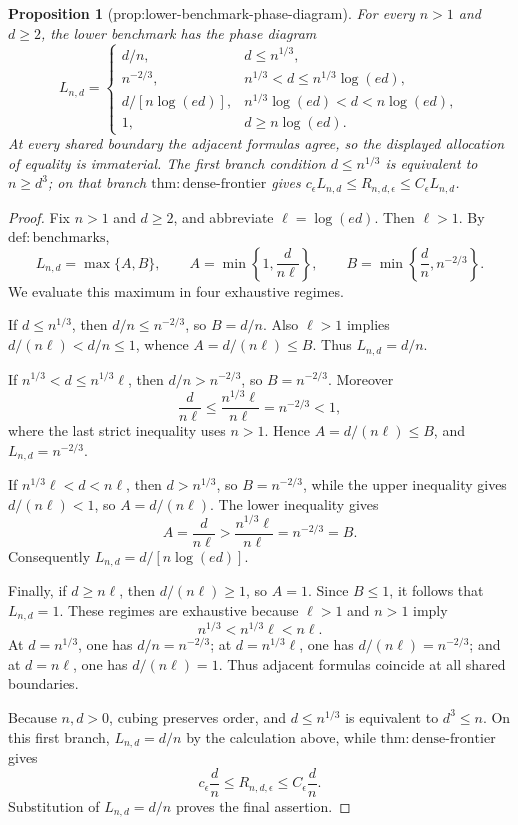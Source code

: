 \documentclass{article}
\newtheorem{proposition}{Proposition}
\begin{document}
\begin{proposition}[prop:lower-benchmark-phase-diagram]\label{prop:lower-benchmark-phase-diagram}
For every \(n>1\) and \(d\geq2\), the lower benchmark has the phase diagram
\[
L_{n,d}=
\begin{cases}
 d/n,
   & d\leq n^{1/3},\\
 n^{-2/3},
   & n^{1/3}<d\leq n^{1/3}\log(ed),\\
 d/[n\log(ed)],
   & n^{1/3}\log(ed)<d<n\log(ed),\\
 1,
   & d\geq n\log(ed).
\end{cases}
\]
At every shared boundary the adjacent formulas agree, so the displayed allocation of equality is immaterial.  The first branch condition \(d\leq n^{1/3}\) is equivalent to \(n\geq d^3\); on that branch \(\mathrm{thm:dense\mbox{-}frontier}\) gives \(c_\epsilon L_{n,d}\leq R_{n,d,\epsilon}\leq C_\epsilon L_{n,d}\).
\end{proposition}
\begin{proof}
Fix \(n>1\) and \(d\geq2\), and abbreviate \(\ell=\log(ed)\).  Then \(\ell>1\).  By \(\mathrm{def:benchmarks}\),
\[
 L_{n,d}=\max\{A,B\},\qquad
 A=\min\!\left\{1,\frac{d}{n\ell}\right\},\qquad
 B=\min\!\left\{\frac dn,n^{-2/3}\right\}.
\]
We evaluate this maximum in four exhaustive regimes.

If \(d\leq n^{1/3}\), then \(d/n\leq n^{-2/3}\), so \(B=d/n\).  Also \(\ell>1\) implies \(d/(n\ell)<d/n\leq1\), whence \(A=d/(n\ell)\leq B\).  Thus \(L_{n,d}=d/n\).

If \(n^{1/3}<d\leq n^{1/3}\ell\), then \(d/n>n^{-2/3}\), so \(B=n^{-2/3}\).  Moreover
\[
 \frac{d}{n\ell}\leq\frac{n^{1/3}\ell}{n\ell}=n^{-2/3}<1,
\]
where the last strict inequality uses \(n>1\).  Hence \(A=d/(n\ell)\leq B\), and \(L_{n,d}=n^{-2/3}\).

If \(n^{1/3}\ell<d<n\ell\), then \(d>n^{1/3}\), so \(B=n^{-2/3}\), while the upper inequality gives \(d/(n\ell)<1\), so \(A=d/(n\ell)\).  The lower inequality gives
\[
 A=\frac{d}{n\ell}>\frac{n^{1/3}\ell}{n\ell}=n^{-2/3}=B.
\]
Consequently \(L_{n,d}=d/[n\log(ed)]\).

Finally, if \(d\geq n\ell\), then \(d/(n\ell)\geq1\), so \(A=1\).  Since \(B\leq1\), it follows that \(L_{n,d}=1\).  These regimes are exhaustive because \(\ell>1\) and \(n>1\) imply
\[
 n^{1/3}<n^{1/3}\ell<n\ell.
\]
At \(d=n^{1/3}\), one has \(d/n=n^{-2/3}\); at \(d=n^{1/3}\ell\), one has \(d/(n\ell)=n^{-2/3}\); and at \(d=n\ell\), one has \(d/(n\ell)=1\).  Thus adjacent formulas coincide at all shared boundaries.

Because \(n,d>0\), cubing preserves order, and \(d\leq n^{1/3}\) is equivalent to \(d^3\leq n\).  On this first branch, \(L_{n,d}=d/n\) by the calculation above, while \(\mathrm{thm:dense\mbox{-}frontier}\) gives
\[
 c_\epsilon\frac dn\leq R_{n,d,\epsilon}\leq C_\epsilon\frac dn.
\]
Substitution of \(L_{n,d}=d/n\) proves the final assertion.
\end{proof}
\end{document}
